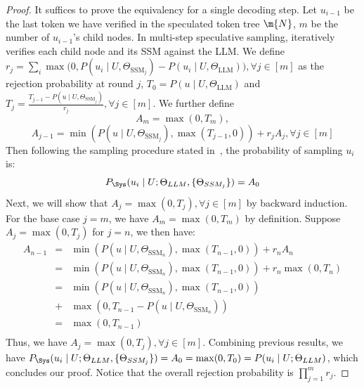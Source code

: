 \begin{proof}
It suffices to prove the equivalency for a single decoding step.
Let $u_{i-1}$ be the last token we have verified in the speculated token tree $\m{N}$, $m$ be the number of $u_{i-1}$'s child nodes. In multi-step speculative sampling, \Sys iteratively verifies each child node and its SSM against the LLM.
We define $r_j=\sum_i \max\big(0, P(u_i \mid U, \Theta_{\textrm{SSM}_j})-P(u_i \mid U, \Theta_{\textrm{LLM}})\big), \forall j \in [m]$ as the rejection probability at round $j$, $T_0 = P(u \mid U, \Theta_{\textrm{LLM}})$ and $T_{j}=\frac{T_{j-1}-P(u \mid U, \Theta_{\textrm{SSM}_j})}{r_j}, \forall j \in [m]$.
We further define $$A_m = \max(0, T_m),$$ $$A_{j-1} = \min(P(u \mid U, \Theta_{\textrm{SSM}_j}), \max(T_{j-1}, 0))+r_{j}A_j, \forall j \in [m]$$
Then following the  sampling procedure stated in~, the probability of sampling $u_i$ is:
$$P_{\rm{\Sys}}(u_i \mid U; \Theta_{LLM}, \{\Theta_{SSM_j}\}) = A_0$$
Next, we will show that $A_j = \max(0, T_j), \forall j \in [m]$ by backward induction.
For the base case $j=m$, we have $A_m = \max(0, T_m)$ by definition. Suppose $A_j = \max(0, T_j)$ for $j=n$, we then have:
\begin{eqnarray*}
    A_{n-1} &=& \min(P(u \mid U, \Theta_{\textrm{SSM}_n}), \max(T_{n-1}, 0))+r_{n}A_n \\
    &=& \min(P(u \mid U, \Theta_{\textrm{SSM}_n}), \max(T_{n-1}, 0))+r_{n}\max(0, T_n) \\ 
    &=& \min(P(u \mid U, \Theta_{\textrm{SSM}_n}), \max(T_{n-1}, 0))\\&+&\max(0, T_{n-1}-P(u \mid U, \Theta_{\textrm{SSM}_n})) \\ 
    &=& \max(0, T_{n-1}) \\ 
\end{eqnarray*}
Thus, we have $A_j = \max(0, T_j), \forall j \in [m]$.
Combining previous results, we have $P_{\rm{\Sys}}(u_i \mid U; \Theta_{LLM}, \{\Theta_{SSM_j}\}) = A_0 = \max(0, T_0) = P(u_i \mid U; \Theta_{LLM})$, which concludes our proof. Notice that the overall rejection probability is $\prod_{j=1}^m r_j$.
\end{proof}

